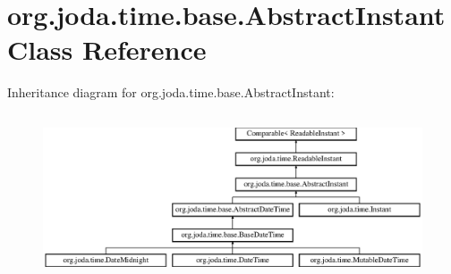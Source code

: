 \hypertarget{classorg_1_1joda_1_1time_1_1base_1_1_abstract_instant}{\section{org.\-joda.\-time.\-base.\-Abstract\-Instant Class Reference}
\label{classorg_1_1joda_1_1time_1_1base_1_1_abstract_instant}
}
Inheritance diagram for org.\-joda.\-time.\-base.\-Abstract\-Instant\-:\begin{figure}[H]
\begin{center}
\leavevmode
\includegraphics[height=4.933921cm]{classorg_1_1joda_1_1time_1_1base_1_1_abstract_instant}
\end{center}
\end{figure}
